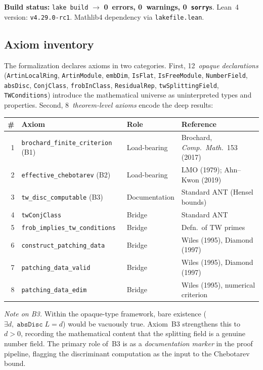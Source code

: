 \documentclass[11pt]{article}
\theoremstyle{plain}
\theoremstyle{definition}
\theoremstyle{remark}
\begin{document}
\medskip\noindent
\textbf{Build status:} \texttt{lake build} $\to$
\textbf{0~errors, 0~warnings, 0~\texttt{sorry}s}.
Lean~4 version: \texttt{v4.29.0-rc1}.  Mathlib4 dependency
via \texttt{lakefile.lean}.

\subsection{Axiom inventory}

\begin{sloppypar}
The formalization declares axioms in two categories.  First,
12~\emph{opaque declarations} (\texttt{ArtinLocalRing},
\texttt{ArtinModule}, \texttt{embDim}, \texttt{IsFlat},
\texttt{IsFreeModule}, \texttt{NumberField}, \texttt{absDisc},
\texttt{ConjClass}, \texttt{frobInClass}, \texttt{ResidualRep},
\texttt{twSplittingField}, \texttt{TWConditions}) introduce the
mathematical universe as uninterpreted types and properties.
Second, 8~\emph{theorem-level axioms} encode the deep results:
\end{sloppypar}

\begin{center}
\small
\renewcommand{\arraystretch}{1.15}
\begin{tabular}{rlll}
\toprule
\textbf{\#} & \textbf{Axiom} & \textbf{Role} & \textbf{Reference} \\
\midrule
1 & \texttt{brochard\_finite\_criterion} (B1) & Load-bearing &
  Brochard, \textit{Comp.\ Math.}\ 153 (2017) \\
2 & \texttt{effective\_chebotarev} (B2) & Load-bearing &
  LMO (1979); Ahn--Kwon (2019) \\
3 & \texttt{tw\_disc\_computable} (B3) & Documentation &
  Standard ANT (Hensel bounds) \\
4 & \texttt{twConjClass} & Bridge &
  Standard ANT \\
5 & \texttt{frob\_implies\_tw\_conditions} & Bridge &
  Defn.\ of TW primes \\
6 & \texttt{construct\_patching\_data} & Bridge &
  Wiles (1995), Diamond (1997) \\
7 & \texttt{patching\_data\_valid} & Bridge &
  Wiles (1995), Diamond (1997) \\
8 & \texttt{patching\_data\_edim} & Bridge &
  Wiles (1995), numerical criterion \\
\bottomrule
\end{tabular}
\end{center}

\smallskip\noindent
\emph{Note on B3.}  Within the opaque-type framework, bare existence
($\exists d,\; \texttt{absDisc}\;L = d$) would be vacuously true.
Axiom~B3 strengthens this to $d > 0$, recording the mathematical
content that the splitting field is a genuine number field.
The primary role of~B3 is as a \emph{documentation marker} in the
proof pipeline, flagging the discriminant computation as the input
to the Chebotarev bound.
\end{document}
